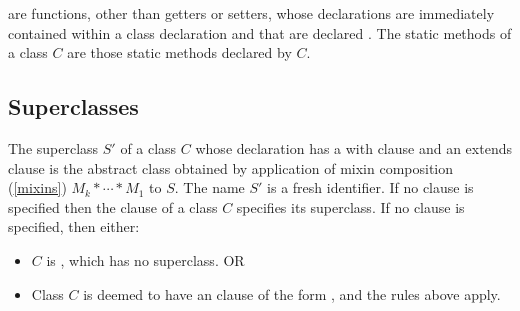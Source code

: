 \documentclass[makeidx]{article}
\begin{document}
\LMHash{}%
are functions, other than getters or setters, whose declarations are immediately contained within a class declaration and that are declared \STATIC{}.
The static methods of a class $C$ are those static methods declared by $C$.




\subsection{Superclasses}


\LMHash{}%
The superclass $S'$ of a class $C$ whose declaration has a with clause
and an extends clause
is the abstract class obtained by application of
mixin composition (\ref{mixins}) $M_k* \cdots * M_1$ to $S$.
The name $S'$ is a fresh identifier.
If no \WITH{} clause is specified then the \EXTENDS{} clause of
a class $C$ specifies its superclass.
If no \EXTENDS{} clause is specified, then either:
\begin{itemize}
\item $C$ is , which has no superclass. OR
\item Class $C$ is deemed to have an \EXTENDS{} clause of the form
, and the rules above apply.
\end{itemize}
\end{document}
